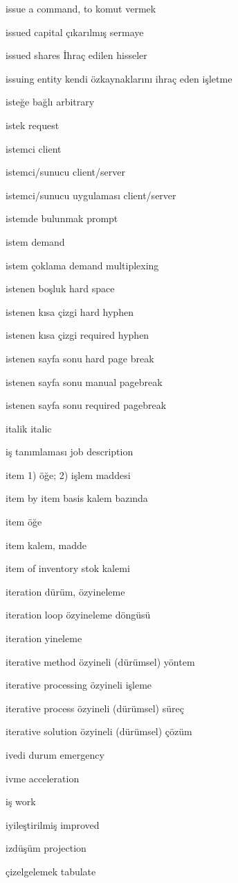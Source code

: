 \documentclass[12pt,fleqn]{article}\usepackage{../../common}
\begin{document}
issue a command, to komut vermek

issued capital çıkarılmış sermaye

issued shares İhraç edilen hisseler

issuing entity kendi özkaynaklarını ihraç eden işletme

isteğe bağlı arbitrary

istek request

istemci client

istemci/sunucu client/server

istemci/sunucu uygulaması client/server

istemde bulunmak prompt

istem demand

istem çoklama demand multiplexing

istenen boşluk hard space

istenen kısa çizgi hard hyphen

istenen kısa çizgi required hyphen

istenen sayfa sonu hard page break

istenen sayfa sonu manual pagebreak

istenen sayfa sonu required pagebreak

italik italic

iş tanımlaması job description

item 1) öğe; 2) işlem maddesi

item by item basis kalem bazında

item öğe

item kalem, madde

item of inventory stok kalemi

iteration dürüm, özyineleme

iteration loop özyineleme döngüsü

iteration yineleme

iterative method özyineli (dürümsel) yöntem

iterative processing özyineli işleme

iterative process özyineli (dürümsel) süreç

iterative solution özyineli (dürümsel) çözüm

ivedi durum emergency

ivme acceleration

iş work

iyileştirilmiş improved

izdüşüm projection

çizelgelemek tabulate
\end{document}
